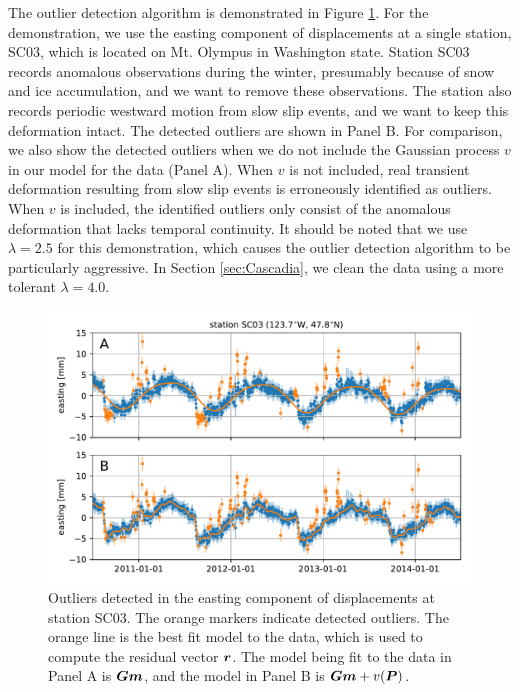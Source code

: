 \documentclass[extra,mreferee]{gji}
\begin{document}
The outlier detection algorithm is demonstrated in Figure
\ref{fig:Outliers}. For the demonstration, we use the easting
component of displacements at a single station, SC03, which is located
on Mt. Olympus in Washington state. Station SC03 records anomalous
observations during the winter, presumably because of snow and ice
accumulation, and we want to remove these observations. The station
also records periodic westward motion from slow slip events, and we
want to keep this deformation intact. The detected outliers are shown
in Panel B. For comparison, we also show the detected outliers when we
do not include the Gaussian process $v$ in our model for the data
(Panel A). When $v$ is not included, real transient deformation
resulting from slow slip events is erroneously identified as outliers.
When $v$ is included, the identified outliers only consist of the
anomalous deformation that lacks temporal continuity.  It should be
noted that we use $\lambda = 2.5$ for this demonstration, which causes
the outlier detection algorithm to be particularly aggressive. In
Section \ref{sec:Cascadia}, we clean the data using a more tolerant
$\lambda = 4.0$.

\begin{figure}
\includegraphics{figures/outliers_new/outliers.pdf}
\caption{
Outliers detected in the easting component of displacements at station
SC03. The orange markers indicate detected outliers. The orange line
is the best fit model to the data, which is used to compute the
residual vector $\mitbf{r}$. The model being fit to the data in Panel
A is $\G\mitbf{m}$, and the model in Panel B is $\G\mitbf{m} +
v(\points)$.
}
\label{fig:Outliers}
\end{figure}


  
\end{document}
